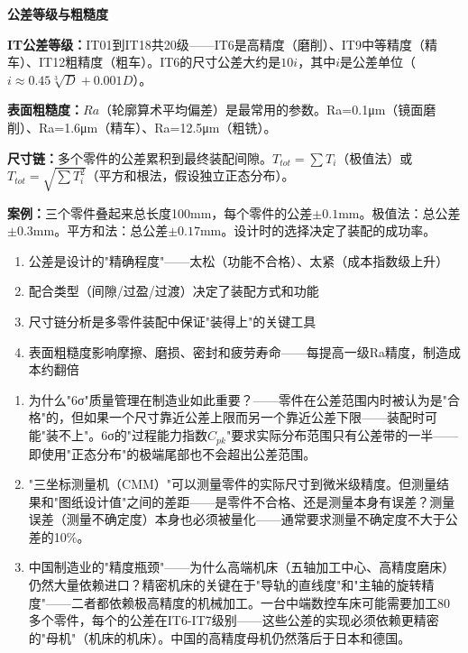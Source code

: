 \documentclass[a4paper,11pt]{ctexbook}
\newenvironment{quantitative}{
  \vspace{0.3cm}
  \noindent\begin{tcolorbox}[colback=quant!5!white,colframe=quant!60!black,title=\textcolor{quant}{\textbf{定量分析}}]
  \vspace{0.1cm}
}{\end{tcolorbox}\vspace{0.3cm}}
\newenvironment{lessonsummary}{
  \vspace{0.3cm}
  \noindent\begin{tcolorbox}[colback=summarybg,colframe=green!50!black,title=\textbf{\textcolor{green!50!black}{总结}}]
  \vspace{0.1cm}
}{\end{tcolorbox}\vspace{0.3cm}}
\newenvironment{discuss}{
  \vspace{0.3cm}
  \noindent\begin{tcolorbox}[colback=discussbg,colframe=orange!60!black,title=\textbf{\textcolor{orange!60!black}{讨论题}}]
  \vspace{0.1cm}
}{\end{tcolorbox}\vspace{0.3cm}}
\begin{document}
\begin{quantitative}
\textbf{公差等级与粗糙度}

\textbf{IT公差等级：}IT01到IT18共20级——IT6是高精度（磨削）、IT9中等精度（精车）、IT12粗精度（粗车）。IT6的尺寸公差大约是$10i$，其中$i$是公差单位（$i \approx 0.45\sqrt[3]{D} + 0.001D$）。

\textbf{表面粗糙度：}$Ra$（轮廓算术平均偏差）是最常用的参数。Ra=0.1μm（镜面磨削）、Ra=1.6μm（精车）、Ra=12.5μm（粗铣）。

\textbf{尺寸链：}多个零件的公差累积到最终装配间隙。$T_{tot} = \sum T_i$（极值法）或 $T_{tot} = \sqrt{\sum T_i^2}$（平方和根法，假设独立正态分布）。

\textbf{案例：}三个零件叠起来总长度100mm，每个零件的公差$\pm 0.1$mm。极值法：总公差$\pm 0.3$mm。平方和法：总公差$\pm 0.17$mm。设计时的选择决定了装配的成功率。
\end{quantitative}

\begin{lessonsummary}
\begin{enumerate}
  \item 公差是设计的"精确程度"——太松（功能不合格）、太紧（成本指数级上升）
  \item 配合类型（间隙/过盈/过渡）决定了装配方式和功能
  \item 尺寸链分析是多零件装配中保证"装得上"的关键工具
  \item 表面粗糙度影响摩擦、磨损、密封和疲劳寿命——每提高一级Ra精度，制造成本约翻倍
\end{enumerate}
\end{lessonsummary}

\begin{discuss}
\begin{enumerate}
  \item 为什么"6σ"质量管理在制造业如此重要？——零件在公差范围内时被认为是"合格"的，但如果一个尺寸靠近公差上限而另一个靠近公差下限——装配时可能"装不上"。6σ的"过程能力指数$C_{pk}$"要求实际分布范围只有公差带的一半——即使用"正态分布"的极端尾部也不会超出公差范围。
  \item "三坐标测量机（CMM）"可以测量零件的实际尺寸到微米级精度。但测量结果和"图纸设计值"之间的差距——是零件不合格、还是测量本身有误差？测量误差（测量不确定度）本身也必须被量化——通常要求测量不确定度不大于公差的10\%。
  \item 中国制造业的"精度瓶颈"——为什么高端机床（五轴加工中心、高精度磨床）仍然大量依赖进口？精密机床的关键在于"导轨的直线度"和"主轴的旋转精度"——二者都依赖极高精度的机械加工。一台中端数控车床可能需要加工80多个零件，每个的公差在IT6-IT7级别——这些公差的实现必须依赖更精密的"母机"（机床的机床）。中国的高精度母机仍然落后于日本和德国。
\end{enumerate}
\end{discuss}
\end{document}
